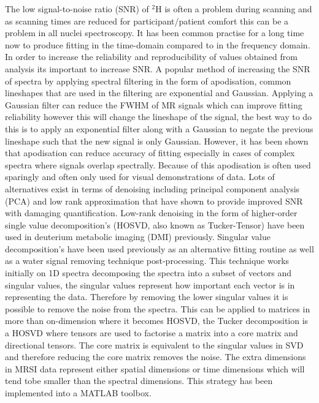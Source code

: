 \documentclass[class=article, crop=false]{standalone}
\begin{document}
The low signal-to-noise ratio (SNR) of $^2$H is often a problem during scanning and as scanning times are reduced for participant/patient comfort this can be a problem in all nuclei spectroscopy. It has been common practise for a long time now to produce fitting in the time-domain compared to in the frequency domain\cite{Joliot1991InMethods}. In order to increase the reliability and reproducibility of values obtained from analysis its important to increase SNR. A popular method of increasing the SNR of spectra by applying spectral filtering in the form of apodisation, common lineshapes that are used in the filtering are exponential and Gaussian\cite{Goryawala2020EffectsFitting}. Applying a Gaussian filter can reduce the FWHM of MR signals which can improve fitting reliability however this will change the lineshape of the signal, the best way to do this is to apply an exponential filter along with a Gaussian to negate the previous lineshape such that the new signal is only Gaussian. However, it has been shown that apodisation can reduce accuracy of fitting especially in cases of complex spectra where signals overlap spectrally\cite{Bartha1999FactorsFiltering}. Because of this apodisation is often used sparingly and often only used for visual demonstrations of data. Lots of alternatives exist in terms of denoising including principal component analysis (PCA)\cite{Abdoli2016DenoisingComponents} and low rank approximation\cite{Nguyen2013DenoisingApproximations} that have shown to provide improved SNR with damaging quantification\cite{Clarke2022UncertaintyMethods}. Low-rank denoising in the form of higher-order single value decomposition's (HOSVD, also known as Tucker-Tensor) have been used in deuterium metabolic imaging (DMI) previously\cite{Kreis2020MeasuringMRI,Assmann2020InCholesterol}. Singular value decomposition's have been used previously as an alternative fitting routine\cite{Pijnappel1992SVD-basedSignals} as well as a water signal removing technique post-processing\cite{Cabanes2001OptimizationBrain}. This technique works initially on 1D spectra decomposing the spectra into a subset of vectors and singular values, the singular values represent how important each vector is in representing the data. Therefore by removing the lower singular values it is possible to remove the noise from the spectra. This can be applied to matrices in more than on-dimension where it becomes HOSVD, the Tucker decomposition is a HOSVD where tensors are used to factorise a matrix into a core matrix and directional tensors. The core matrix is equivalent to the singular values in SVD and therefore reducing the core matrix removes the noise\cite{Tucker1966SomeAnalysis}. The extra dimensions in MRSI data represent either spatial dimensions or time dimensions which will tend tobe smaller than the spectral dimensions. This strategy has been implemented into a MATLAB toolbox\cite{Bader2007EfficientTensors}.
\end{document}
